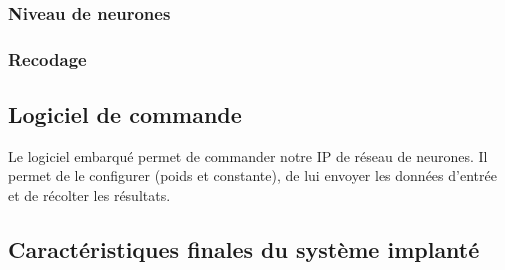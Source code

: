 \subsubsection{Niveau de neurones}
\subsubsection{Recodage}

\subsection{Logiciel de commande}
Le logiciel embarqué permet de commander notre IP de réseau de neurones. Il
permet de le configurer (poids et constante), de lui envoyer les données
d'entrée et de récolter les résultats.

\subsection{Caractéristiques finales du système implanté}
